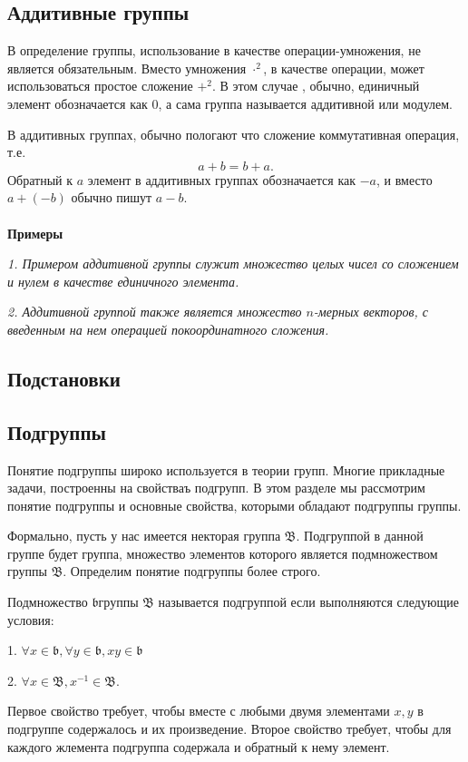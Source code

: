 {\subsection{Аддитивные группы}
В определение группы, использование в качестве операции-умножения, не является обязательным. Вместо умножения $\cdot^2$, в качестве операции, может использоваться простое сложение $+^2$. В этом случае  , обычно, единичный элемент обозначается как $0$, а сама группа называется аддитивной или модулем.

В аддитивных группах, обычно пологают что сложение коммутативная операция, т.е.
$$a+b=b+a.$$
Обратный к $a$ элемент в аддитивных группах обозначается как $-a$, и вместо $a+(-b)$ обычно пишут $a-b$.\\ \\
\textbf{Примеры}

\textit{1. Примером аддитивной группы служит множество целых чисел со сложением и нулем в качестве единичного элемента.}

\textit{2. Аддитивной группой также является множество $n$-мерных векторов, с введенным на нем операцией покоординатного сложения.}
\subsection{Подстановки}
\subsection{Подгруппы}
Понятие подгруппы широко используется в теории групп. Многие прикладные задачи, построенны на свойстваъ подгрупп. В этом разделе мы рассмотрим понятие подгруппы и основные свойства, которыми обладают подгруппы группы.

Формально, пусть у нас имеется некторая группа $\mathfrak {B}$. Подгруппой в данной группе будет группа, множество элементов которого является подмножеством группы $\mathfrak {B}$.
Определим понятие подгруппы более строго.
\begin{Def}
Подмножество $\mathfrak {b} $группы $\mathfrak {B}$ называется подгруппой если выполняются следующие условия:

1. $\forall x \in \mathfrak {b}, \forall y \in \mathfrak {b}, xy \in \mathfrak {b} $

2. $ \forall x \in \mathfrak {B}, x^{-1} \in \mathfrak {B}.$ 
\end{Def}

Первое свойство требует, чтобы вместе с любыми двумя элементами $x,y$ в подгруппе содержалось и их произведение.
Второе свойство требует, чтобы для каждого жлемента подгруппа содержала и обратный к нему элемент.

}
